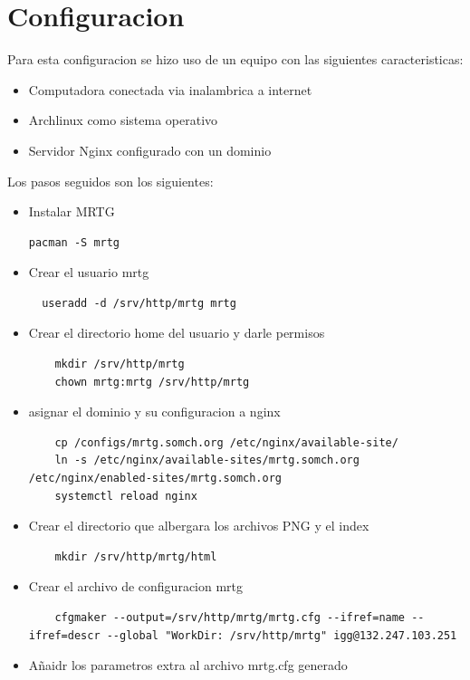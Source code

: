 \documentclass[letterpaper]{article}
\begin{document}
\section{Configuracion}\label{sec:objgen}
Para esta configuracion se hizo uso de un equipo con las siguientes caracteristicas:
\begin{itemize}
  \item Computadora conectada via inalambrica a internet
  \item Archlinux como sistema operativo
  \item Servidor Nginx configurado con un dominio
\end{itemize}
Los pasos seguidos son los siguientes:
\begin{itemize}
  \item Instalar MRTG\\\begin{lstlisting}
pacman -S mrtg
\end{lstlisting}
  \item Crear el usuario mrtg \\\begin{lstlisting}
  useradd -d /srv/http/mrtg mrtg
\end{lstlisting}
  \item Crear el directorio home del usuario y darle permisos\\
  \begin{lstlisting}
    mkdir /srv/http/mrtg
    chown mrtg:mrtg /srv/http/mrtg
  \end{lstlisting}
  \item asignar el dominio y su configuracion a nginx
  \begin{lstlisting}
    cp /configs/mrtg.somch.org /etc/nginx/available-site/
    ln -s /etc/nginx/available-sites/mrtg.somch.org /etc/nginx/enabled-sites/mrtg.somch.org
    systemctl reload nginx
  \end{lstlisting}
  \item Crear el directorio que albergara los archivos PNG y el index
  \begin{lstlisting}
    mkdir /srv/http/mrtg/html
  \end{lstlisting}
  \item Crear el archivo de configuracion mrtg
  \begin{lstlisting}
    cfgmaker --output=/srv/http/mrtg/mrtg.cfg --ifref=name --ifref=descr --global "WorkDir: /srv/http/mrtg" igg@132.247.103.251
  \end{lstlisting}
  \item Añaidr los parametros extra al archivo mrtg.cfg generado

\end{itemize}
\end{document}
